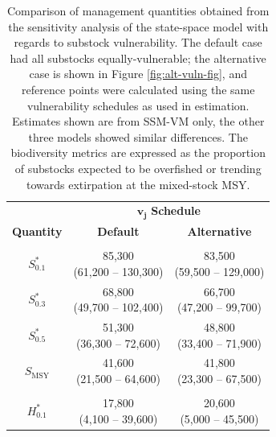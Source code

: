 \documentclass[12pt,]{book}
\theoremstyle{definition}
\theoremstyle{definition}
\theoremstyle{definition}
\theoremstyle{remark}
\begin{document}
\begin{table}

\caption{\label{tab:alt-vuln-table}Comparison of management quantities obtained from the sensitivity analysis of the state-space model with regards to substock vulnerability. The default case had all substocks equally-vulnerable; the alternative case is shown in Figure \ref{fig:alt-vuln-fig}, and reference points were calculated using the same vulnerability schedules as used in estimation. Estimates shown are from SSM-VM only, the other three models showed similar differences. The biodiversity metrics are expressed as the proportion of substocks expected to be overfished or trending towards extirpation at the mixed-stock MSY.}
\centering
\begin{tabular}[t]{ccc}
\toprule
\multicolumn{1}{c}{} & \multicolumn{2}{c}{$\boldsymbol{v_j}$ \textbf{Schedule}} \\
\cmidrule(l{2pt}r{2pt}){2-3}
\textbf{Quantity} & \textbf{Default} & \textbf{Alternative}\\
\midrule
\addlinespace[0.3em]
\multicolumn{3}{l}{\textbf{Escapement}}\\
\hline
\hspace{1em}$S^*_{0.1}$ & \makecell[c]{85,300\\(61,200 -- 130,300)} & \makecell[c]{83,500\\(59,500 -- 129,000)}\\
\hspace{1em}$S^*_{0.3}$ & \makecell[c]{68,800\\(49,700 -- 102,400)} & \makecell[c]{66,700\\(47,200 -- 99,700)}\\
\hspace{1em}$S^*_{0.5}$ & \makecell[c]{51,300\\(36,300 -- 72,600)} & \makecell[c]{48,800\\(33,400 -- 71,900)}\\
\hspace{1em}$S_{\text{MSY}}$ & \makecell[c]{41,600\\(21,500 -- 64,600)} & \makecell[c]{41,800\\(23,300 -- 67,500)}\\
\addlinespace[0.3em]
\multicolumn{3}{l}{\textbf{Harvest}}\\
\hline
\hspace{1em}$H^*_{0.1}$ & \makecell[c]{17,800\\(4,100 -- 39,600)} & \makecell[c]{20,600\\(5,000 -- 45,500)}\\

\end{tabular}
\end{table}
\end{document}
